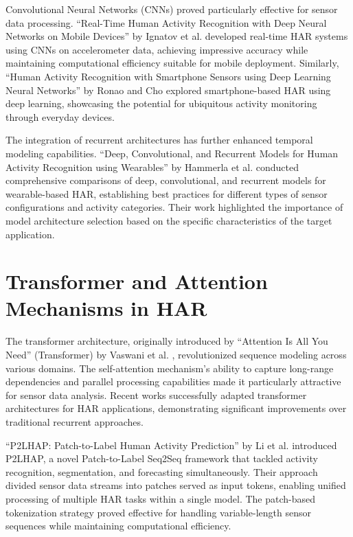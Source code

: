 Convolutional Neural Networks (CNNs) proved particularly effective for sensor data processing. ``Real-Time Human Activity Recognition with Deep Neural Networks on Mobile Devices'' by Ignatov et al. \cite{Ignatov2018RealTime} developed real-time HAR systems using CNNs on accelerometer data, achieving impressive accuracy while maintaining computational efficiency suitable for mobile deployment. Similarly, ``Human Activity Recognition with Smartphone Sensors using Deep Learning Neural Networks'' by Ronao and Cho \cite{Ronao2016Human} explored smartphone-based HAR using deep learning, showcasing the potential for ubiquitous activity monitoring through everyday devices.

The integration of recurrent architectures has further enhanced temporal modeling capabilities. ``Deep, Convolutional, and Recurrent Models for Human Activity Recognition using Wearables'' by Hammerla et al. \cite{Hammerla2016Deep} conducted comprehensive comparisons of deep, convolutional, and recurrent models for wearable-based HAR, establishing best practices for different types of sensor configurations and activity categories. Their work highlighted the importance of model architecture selection based on the specific characteristics of the target application.

\section{Transformer and Attention Mechanisms in HAR}

\hspace{2em}The transformer architecture, originally introduced by ``Attention Is All You Need'' (Transformer) by Vaswani et al. \cite{Vaswani2017Attention}, revolutionized sequence modeling across various domains. The self-attention mechanism's ability to capture long-range dependencies and parallel processing capabilities made it particularly attractive for sensor data analysis. Recent works successfully adapted transformer architectures for HAR applications, demonstrating significant improvements over traditional recurrent approaches.

``P2LHAP: Patch-to-Label Human Activity Prediction'' by Li et al. \cite{Li2024P2LHAP} introduced P2LHAP, a novel Patch-to-Label Seq2Seq framework that tackled activity recognition, segmentation, and forecasting simultaneously. Their approach divided sensor data streams into patches served as input tokens, enabling unified processing of multiple HAR tasks within a single model. The patch-based tokenization strategy proved effective for handling variable-length sensor sequences while maintaining computational efficiency.

